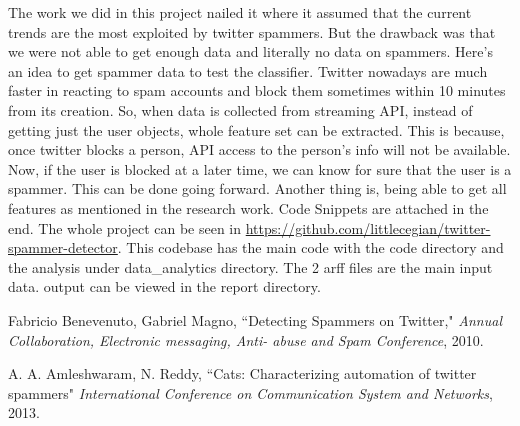 \documentclass[11pt]{article}
\begin{document}
The work we did in this project nailed it where it assumed that the current trends are the most exploited by twitter spammers. But the drawback was that we were not able to get enough data and literally no data on spammers.
Here's an idea to get spammer data to test the classifier. Twitter nowadays are much faster in reacting to spam accounts and block them sometimes within 10 minutes from its creation. So, when data is collected from streaming API, instead of getting just the user objects, whole feature set can be extracted. This is because, once twitter blocks a person, API access to the person's info will not be available. Now, if the user is blocked at a later time, we can know for sure that the user is a spammer. This can be done going forward. Another thing is, being able to get all features as mentioned in the research work. Code Snippets are attached in the end. The whole project can be seen in \url{https://github.com/littlecegian/twitter-spammer-detector}. This codebase has the main code with the code directory and the analysis under data\_analytics directory. The 2 arff files are the main input data. output can be viewed in the report directory.

\begin{thebibliography}{99}


Fabricio Benevenuto, Gabriel Magno, ``Detecting Spammers on Twitter," \emph{Annual Collaboration, Electronic messaging, Anti-
abuse and Spam Conference}, 2010.

A. A. Amleshwaram, N. Reddy, ``Cats:
Characterizing automation of twitter spammers" \emph{International Conference on Communication System and Networks}, 2013.

\end{thebibliography}

\newpage
\appendix
\renewcommand\thesection{\appendixname~\Alph{section}}
\renewcommand\theequation{\Alph{section}.\arabic{equation}}
\end{document}
